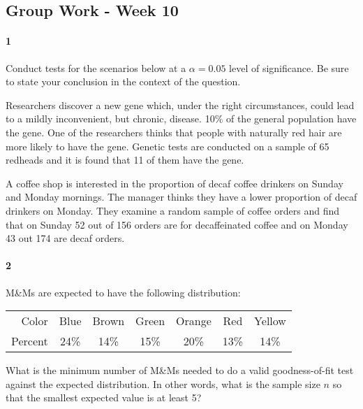 \documentclass{article}
\begin{document}
\begin{flushleft}
\section*{Group Work - Week 10}

\paragraph{1} Conduct tests for the scenarios below at a $\alpha = 0.05$ level of significance. Be sure to state your conclusion in the context of the question.

\begin{enumalpha}
\item Researchers discover a new gene which, under the right circumstances, could lead to a mildly inconvenient, but chronic, disease. 10\% of the general population have the gene. One of the researchers thinks that people with naturally red hair are more likely to have the gene. Genetic tests are conducted on a sample of 65 redheads and it is found that 11 of them have the gene. 
\vspace{3in}

\item A coffee shop is interested in the proportion of decaf coffee drinkers on Sunday and Monday mornings. The manager thinks they have a lower proportion of decaf drinkers on Monday. They examine a random sample of coffee orders and find that on Sunday 52 out of 156 orders are for decaffeinated coffee and on Monday 43 out 174 are decaf orders. 
\end{enumalpha}

\newpage
\paragraph{2} M\&Ms are expected to have the following distribution:\\
\smallskip
{\centering
\begin{tabular}{r | c c c c c c }
Color & Blue & Brown & Green & Orange & Red & Yellow\\
Percent & 24\% & 14\% & 15\% & 20\% & 13\% & 14\% 
\end{tabular}
\par} 
\begin{enumalpha}
\item What is the minimum number of M\&Ms needed to do a valid goodness-of-fit test against the expected distribution. In other words, what is the sample size $n$ so that the smallest expected value is at least 5?
\vspace{2.5in}


\end{enumalpha}
\end{flushleft}
\end{document}
